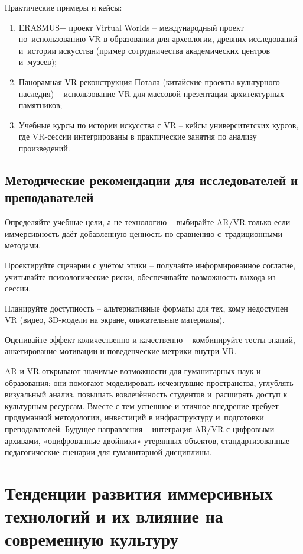 \documentclass{ou}
\begin{document}
Практические примеры и кейсы:
\begin{enumerate}[leftmargin=0em, itemindent=3.75em, nosep, label=\arabic*)]
\item ERASMUS+ проект Virtual Worlds -- международный проект по~использованию VR в образовании для археологии, древних исследований и~истории искусства (пример сотрудничества академических центров и~музеев);
\item Панорамная VR-реконструкция Потала (китайские проекты культурного наследия) -- использование VR для массовой презентации архитектурных памятников;
\item Учебные курсы по истории искусства с VR -- кейсы университетских курсов, где VR-сессии интегрированы в практические занятия по анализу произведений.
\end{enumerate}
\subsection{Методические рекомендации для исследователей и преподавателей}
Определяйте учебные цели, а не технологию -- выбирайте AR/VR только если иммерсивность даёт добавленную ценность по сравнению с~традиционными методами. 

Проектируйте сценарии с учётом этики -- получайте информированное согласие, учитывайте психологические риски, обеспечивайте возможность выхода из сессии. 

Планируйте доступность -- альтернативные форматы для тех, кому недоступен VR (видео, 3D-модели на экране, описательные материалы). 

Оценивайте эффект количественно и качественно -- комбинируйте тесты знаний, анкетирование мотивации и поведенческие метрики внутри VR. 

AR и VR открывают значимые возможности для гуманитарных наук и образования: они помогают моделировать исчезнувшие пространства, углублять визуальный анализ, повышать вовлечённость студентов и~расширять доступ к культурным ресурсам. Вместе с тем успешное и этичное внедрение требует продуманной методологии, инвестиций в инфраструктуру и~подготовки преподавателей. Будущее направления -- интеграция AR/VR с цифровыми архивами, «оцифрованные двойники» утерянных объектов, стандартизованные педагогические сценарии для гуманитарной дисциплины.
\newpage
\section{Тенденции развития иммерсивных технологий и их влияние на современную культуру}
\end{document}

